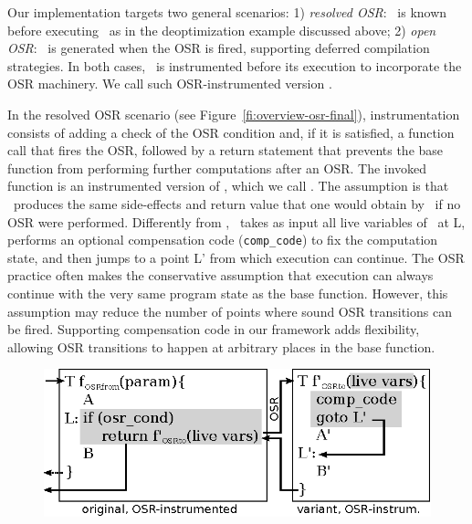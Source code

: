 Our implementation targets two general scenarios: 1) {\em resolved OSR}: \fvariant\ is known before executing \fbase\ as in the deoptimization example discussed above; 2) {\em open OSR}: \fvariant\ is generated when the OSR is fired, supporting deferred compilation strategies. In both cases, \fbase\ is instrumented before its execution to incorporate the OSR machinery. We call such OSR-instrumented version \fosrfrom.

In the resolved OSR scenario (see Figure~\ref{fi:overview-osr-final}), instrumentation consists of adding a check of the OSR condition and, if it is satisfied, a function call that fires the OSR, followed by a return statement that prevents the base function from performing further computations after an OSR. The invoked function is an instrumented version of \fvariant, which we call \fosrto. The assumption is that \fosrto\ produces the same side-effects and return value that one would obtain by \fbase\ if no OSR were performed. Differently from \fvariant, \fosrto\ takes as input all live variables of \fbase\ at \textsf{L}, performs an optional compensation code ({\tt comp_code}) to fix the computation state, and then jumps to a point \textsf{L'} from which execution can continue. The OSR practice often makes the conservative assumption that execution can always continue with the very same program state as the base function. However, this assumption may reduce the number of points where sound OSR transitions can be fired. Supporting compensation code in our framework adds flexibility, allowing OSR transitions to happen at arbitrary places in the base function.


%
%

\ifdefined\noauthorea
\begin{figure}[t]
\begin{center}
\includegraphics[width=0.7\columnwidth]{figures/overview-osr-final/overview-osr-final.eps}
\caption{\protect}
\end{center}
\end{figure}
\fi

